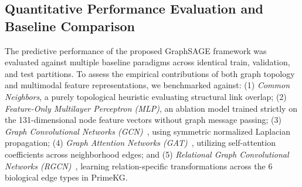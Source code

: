 \documentclass[preprint,12pt]{elsarticle}
\begin{document}
\subsection{Quantitative Performance Evaluation and Baseline Comparison}
The predictive performance of the proposed GraphSAGE framework was evaluated against multiple baseline paradigms across identical train, validation, and test partitions. To assess the empirical contributions of both graph topology and multimodal feature representations, we benchmarked against: (1) \textit{Common Neighbors}, a purely topological heuristic evaluating structural link overlap; (2) \textit{Feature-Only Multilayer Perceptron (MLP)}, an ablation model trained strictly on the 131-dimensional node feature vectors without graph message passing; (3) \textit{Graph Convolutional Networks (GCN)}~\cite{ref2}, using symmetric normalized Laplacian propagation; (4) \textit{Graph Attention Networks (GAT)}~\cite{ref_gat}, utilizing self-attention coefficients across neighborhood edges; and (5) \textit{Relational Graph Convolutional Networks (RGCN)}~\cite{ref_rgcn}, learning relation-specific transformations across the 6 biological edge types in PrimeKG.
\end{document}
